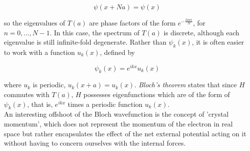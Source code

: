 \begin{equation*}
    \psi(x+Na) = \psi(x)
\end{equation*}

so the eigenvalues of $T(a)$ are phase factors of the form $e^{-\frac{2n\pi i}{N}}$, for $n = 0,..., N-1$. In this case, the spectrum of $T(a)$ is discrete, although each eigenvalue is still infinite-fold degenerate. Rather than $\psi_{k}(x)$, it is often easier to work with a function $u_{k}(x)$, defined by

\begin{equation}
    \psi_{k}(x) = e^{ikx} u_{k}(x)
\end{equation}

where $u_{k}$ is periodic, $u_{k}(x+a) = u_{k}(x)$. \textit{Bloch's theorem} states that since $H$ commutes with $T(a)$, $H$ possesses eigenfunctions which are of the form of $\psi_{k}(x)$, that is, $e^{ikx}$ times a periodic function $u_{k}(x)$. \\
An interesting offshoot of the Bloch wavefunction is the concept of 'crystal momentum', which does not represent the momentum of the electron in real space but rather encapsulates the effect of the net external potential acting on it without having to concern ourselves with the internal forces. 